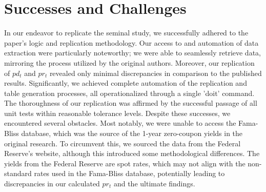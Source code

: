 \documentclass{article}
\begin{document}
\section{Successes and Challenges}
In our endeavor to replicate the seminal study, we successfully adhered to the paper's logic and replication methodology. Our access
to and automation of data extraction were particularly noteworthy; we were able to seamlessly retrieve data, mirroring the process utilized
by the original authors. Moreover, our replication of $pd_t$ and $pr_t$
revealed only minimal discrepancies in comparison to the published results.
Significantly, we achieved complete automation of the replication and
table generation processes, all operationalized through a single 'doit'
command. The thoroughness of our replication was affirmed by the
successful passage of all unit tests within reasonable tolerance levels.\newline
\newline
Despite these successes, we encountered several obstacles. Most notably, 
we were unable to access the Fama-Bliss database, which was the 
source of the 1-year zero-coupon yields in the original research. To 
circumvent this, we sourced the data from the Federal Reserve's website, 
although this introduced some methodological differences. The yields 
from the Federal Reserve are spot rates, which may not align with the 
non-standard rates used in the Fama-Bliss database, potentially leading 
to discrepancies in our calculated $pr_t$ and the ultimate findings. 


\end{document}

